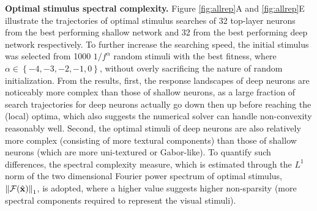 \documentclass[10pt,twocolumn,letterpaper]{article}
\begin{document}
{\bf Optimal stimulus spectral complexity.} Figure \ref{fig:allrep}A and \ref{fig:allrep}E illustrate the trajectories of optimal stimulus searches of 32 top-layer neurons from the best performing shallow network and 32 from the best performing deep network respectively.
To further increase the searching speed, the initial stimulus {was} selected from 1000 ${1}/{f^{\alpha}}$ random stimuli with the best fitness, where $\alpha \in \left\lbrace -4,-3,-2,-1,0 \right\rbrace$, without overly sacrificing the nature of random initialization.
From the results, first, the response landscapes of deep neurons are noticeably more complex than those of shallow neurons, as a large fraction of search trajectories for deep neurons actually go down then up before reaching the (local) optima, which also suggests the numerical solver can handle non-convexity reasonably well.
Second, the optimal stimuli of deep neurons are also relatively more complex (\ie consisting of more textural components) than those of shallow neurons (which are more uni-textured or Gabor-like).
To quantify such differences, the spectral complexity measure, which is estimated through the $L^{1}$ norm of the two dimensional Fourier power spectrum of optimal stimulus, \ie $\left\| \mathcal{F}(\hat{\bf{x}}) \right\|_{1}$, is adopted, where a higher value suggests higher non-sparsity (\ie more spectral components required to represent the visual stimuli).
\end{document}
